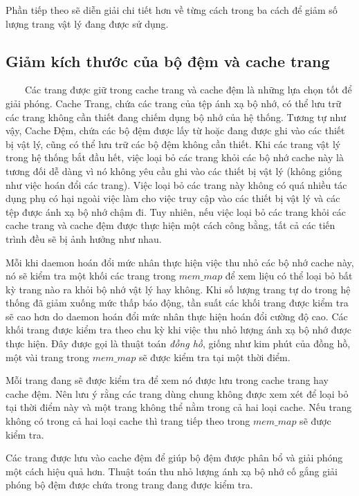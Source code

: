 \documentclass{article}
\begin{document}
Phần tiếp theo sẽ diễn giải chi tiết hơn về từng cách trong ba cách để giảm số lượng trang vật lý đang được sử dụng.

\subsection{Giảm kích thước của bộ đệm và cache trang}

~~~~Các trang được giữ trong cache trang và cache đệm là những lựa chọn tốt để giải phóng. Cache Trang, chứa các trang của tệp ánh xạ bộ nhớ, có thể lưu trữ các trang không cần thiết đang chiếm dụng bộ nhớ của hệ thống. Tương tự như vậy, Cache Đệm, chứa các bộ đệm được lấy từ hoặc đang được ghi vào các thiết bị vật lý, cũng có thể lưu trữ các bộ đệm không cần thiết. Khi các trang vật lý trong hệ thống bắt đầu hết, việc loại bỏ các trang khỏi các bộ nhớ cache này là tương đối dễ dàng vì nó không yêu cầu ghi vào các thiết bị vật lý (không giống như việc hoán đổi các trang). Việc loại bỏ các trang này không có quá nhiều tác dụng phụ có hại ngoài việc làm cho việc truy cập vào các thiết bị vật lý và các tệp được ánh xạ bộ nhớ chậm đi. Tuy nhiên, nếu việc loại bỏ các trang khỏi các cache trang và cache đệm được thực hiện một cách công bằng, tất cả các tiến trình đều sẽ bị ảnh hưởng như nhau.\vspace{1em}

Mỗi khi daemon hoán đổi mức nhân thực hiện việc thu nhỏ các bộ nhớ cache này, nó sẽ kiểm tra một khối các trang trong $mem\_map$ để xem liệu có thể loại bỏ bất kỳ trang nào ra khỏi bộ nhớ vật lý hay không. Khi số lượng trang tự do trong hệ thống đã giảm xuống mức thấp báo động, tần suất các khối trang được kiểm tra sẽ cao hơn do daemon hoán đổi mức nhân thực hiện hoán đổi cường độ cao. Các khối trang được kiểm tra theo chu kỳ khi việc thu nhỏ lượng ánh xạ bộ nhớ được thực hiện. Đây được gọi là thuật toán \textit{đồng hồ}, giống như kim phút của đồng hồ, một vài trang trong $mem\_map$ sẽ được kiểm tra tại một thời điểm.\vspace{1em}

Mỗi trang đang sẽ được kiểm tra để xem nó được lưu trong cache trang hay cache đệm. Nên lưu ý rằng các trang dùng chung không được xem xét để loại bỏ tại thời điểm này và một trang không thể nằm trong cả hai loại cache. Nếu trang không có trong cả hai loại cache thì trang tiếp theo trong $mem\_map$ sẽ được kiểm tra.\vspace{1em}

Các trang được lưu vào cache đệm để giúp bộ đệm được phân bổ và giải phóng một cách hiệu quả hơn. Thuật toán thu nhỏ lượng ánh xạ bộ nhớ cố gắng giải phóng bộ đệm được chứa trong trang đang được kiểm tra.\vspace{1em}
\end{document}
